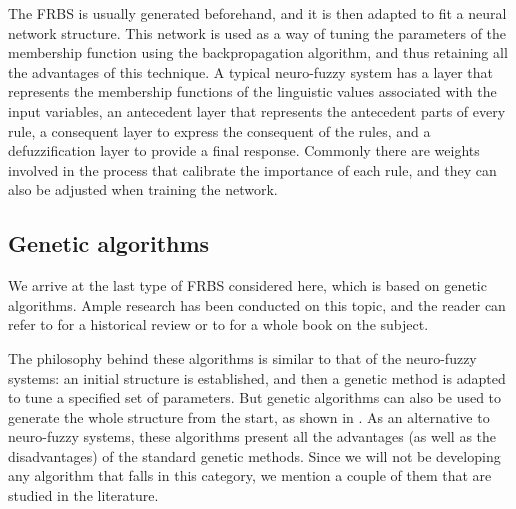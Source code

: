 The FRBS is usually generated beforehand, and it is then adapted to fit a neural network structure. This network is used as a way of tuning the parameters of the membership function using the backpropagation algorithm, and thus retaining all the advantages of this technique. A typical neuro-fuzzy system has a layer that represents the membership functions of the linguistic values associated with the input variables, an antecedent layer that represents the antecedent parts of every rule, a consequent layer to express the consequent of the rules, and a defuzzification layer to provide a final response. Commonly there are weights involved in the process that calibrate the importance of each rule, and they can also be adjusted when training the network.

\subsection{Genetic algorithms}

We arrive at the last type of FRBS considered here, which is based on genetic algorithms. Ample research has been conducted on this topic, and the reader can refer to \cite{cordon2011historical} for a historical review or to \cite{cordon2001genetic} for a whole book on the subject.

The philosophy behind these algorithms is similar to that of the neuro-fuzzy systems: an initial structure is established, and then a genetic method is adapted to tune a specified set of parameters. But genetic algorithms can also be used to generate the whole structure from the start, as shown in \cite{cordon2001generating}. As an alternative to neuro-fuzzy systems, these algorithms present all the advantages (as well as the disadvantages) of the standard genetic methods. Since we will not be developing any algorithm that falls in this category, we mention a couple of them that are studied in the literature.

